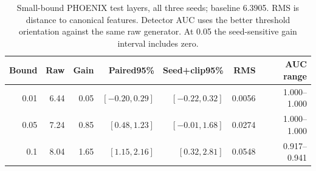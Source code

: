 \begin{table}[t]
\centering\small
\caption{Small-bound PHOENIX test layers, all three seeds; baseline 6.3905. RMS is distance to canonical features. Detector AUC uses the better threshold orientation against the same raw generator. At 0.05 the seed-sensitive gain interval includes zero.}
\label{tab:smallbudget}
\begin{tabular}{rrrrrrr}\toprule
Bound&Raw&Gain&Paired95\%&Seed+clip95\%&RMS&AUC range\\\midrule
0.01&6.44&0.05&$[-0.20,0.29]$&$[-0.22,0.32]$&0.0056&1.000--1.000\\
0.05&7.24&0.85&$[0.48,1.23]$&$[-0.01,1.68]$&0.0274&1.000--1.000\\
0.1&8.04&1.65&$[1.15,2.16]$&$[0.32,2.81]$&0.0548&0.917--0.941\\
\bottomrule\end{tabular}\end{table}
